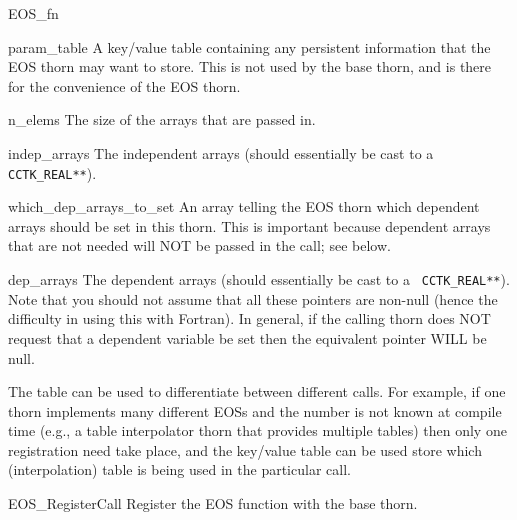 \begin{FunctionDescription}{EOS\_fn}
  \begin{ParameterSection}
    \begin{Parameter}{param\_table}
      A key/value table containing any persistent information that the
      EOS thorn may want to store. This is not used by the base thorn,
      and is there for the convenience of the EOS thorn.
    \end{Parameter}
    \begin{Parameter}{n\_elems}
      The size of the arrays that are passed in.
    \end{Parameter}
    \begin{Parameter}{indep\_arrays}
      The independent arrays (should essentially be cast to a {\tt
        CCTK\_REAL**}).
    \end{Parameter}
    \begin{Parameter}{which\_dep\_arrays\_to\_set}
      An array telling the EOS thorn which dependent arrays should be
      set in this thorn. This is important because dependent arrays
      that are not needed will NOT be passed in the call; see below.
    \end{Parameter}
    \begin{Parameter}{dep\_arrays}
      The dependent arrays (should essentially be cast to a {\tt
        CCTK\_REAL**}). Note that you should not assume that all these
      pointers are non-null (hence the difficulty in using this with
      Fortran). In general, if the calling thorn does NOT request that
      a dependent variable be set then the equivalent pointer WILL be
      null.
    \end{Parameter}
  \end{ParameterSection}

  \begin{Discussion}
    The table can be used to differentiate between different
    calls. For example, if one thorn implements many different
    EOSs and the number is not known at compile time (e.g., a table
    interpolator thorn that provides multiple tables) then only one
    registration need take place, and the key/value table can be used
    store which (interpolation) table is being used in the particular
    call. 
  \end{Discussion}

  \begin{SeeAlsoSection}
    \begin{SeeAlso}{EOS\_RegisterCall}
      Register the EOS function with the base thorn.
    \end{SeeAlso}
  \end{SeeAlsoSection}
\end{FunctionDescription}



\begin{thebibliography}{9}

\end{thebibliography}



